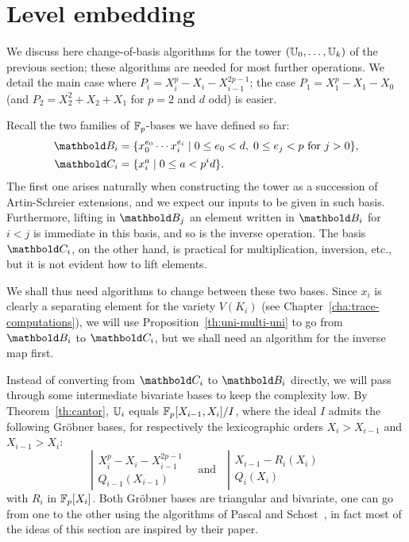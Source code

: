 

\section{Level embedding}
\label{sec:level-embedding}

We discuss here change-of-basis algorithms for the tower $(\mathbb{U}_0,
\ldots, \mathbb{U}_k)$ of the previous section; these algorithms are needed
for most further operations. We detail the main case where $P_i =
X_i^p - X_i - X_{i-1}^{2p-1}$; the case $P_1= X_1^p - X_1 - X_0$ (and
$P_2=X_2^2+X_2+X_1$ for $p=2$ and $d$ odd) is easier.

Recall the two families of $\mathbb{F}_p$-bases we have defined so far:
\begin{align}
  \pdfmctwo{Explicit indices for the basis.}
  \basis{B}_i &=
  \{x_0^{e_0} \cdots x_i^{e_i} \;|\; 0 \le e_0 < d,\; 0\le e_j < p 
  \text{ for $j>0$}\}
  \text{,}\\
  \basis{C}_i&=\{x_i^a \;|\; 0\le a<p^id\}
  \text{.}  
\end{align}
The first one arises naturally when constructing the tower as a
succession of Artin-Schreier extensions, and we expect our inputs to
be given in such basis. Furthermore, lifting in $\basis{B}_j$ an
element written in $\basis{B}_i$ for $i<j$ is immediate in this basis,
and so is the inverse operation. The basis $\basis{C}_i$, on the other
hand, is practical for multiplication, inversion, etc., but it is not
evident how to lift elements.

We shall thus need algorithms to change between these two bases. Since
$x_i$ is clearly a separating element for the variety $V(K_i)$ (see
Chapter~\ref{cha:trace-computations}), we will use
Proposition~\ref{th:uni-multi-uni} to go from $\basis{B}_i$ to
$\basis{C}_i$, but we shall need an algorithm for the inverse map first.

Instead of converting from $\basis{C}_i$ to $\basis{B}_i$ directly, we
will pass through some intermediate bivariate bases to keep the
complexity low. By Theorem~\ref{th:cantor}, $\mathbb{U}_i$ equals
$\mathbb{F}_p[X_{i-1},X_i]/I$, where the ideal $I$ admits the following
Gr{\"o}bner bases, for respectively the lexicographic orders
$X_i>X_{i-1}$ and $X_{i-1}>X_i$:
\begin{equation}
  \left |
  \begin{array}{rl}
    X_i^p - X_i - X_{i-1}^{2p-1} \\
    Q_{i-1}(X_{i-1})         
  \end{array}
\right.
  \quad \text{and}\quad
  \left |
  \begin{array}{rl}
    X_{i-1} - R_i(X_i) \\
    Q_i(X_i)
  \end{array}
\right.
\end{equation}
with $R_i$ in $\mathbb{F}_p[X_i]$. Both Gröbner bases are triangular and
bivariate, one can go from one to the other using the algorithms of
Pascal and Schost~\cite{pascal+schost06}, in fact most of the ideas of
this section are inspired by their paper.

